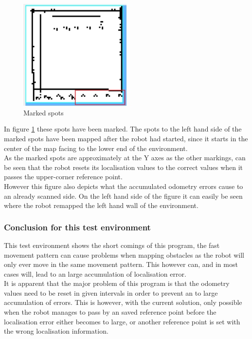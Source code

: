 \begin{figure}[h]
\centering
\includegraphics[width = 0.5\textwidth]{../../figures/map_results/dotted_odometry_error.png} 
\caption{Marked spots}
\label{dotted_odomery_error}
\end{figure}

In figure \ref{dotted_odomery_error} these spots have been marked. The spots to the left hand side of the marked spots have been mapped after the robot had started, since it starts in the center of the map facing to the lower end of the environment. \\
As the marked spots are approximately at the Y axes as the other markings, can be seen that the robot resets its localisation values to the correct values when it passes the upper-corner reference point. \\
However this figure also depicts what the accumulated odometry errors cause to an already scanned side. On the left hand side of the figure it can easily be seen where the robot remapped the left hand wall of the environment.\\

\subsubsection{Conclusion for this test environment}
This test environment shows the short comings of this program, the fast movement pattern can cause problems when mapping obstacles as the robot will only ever move in the same movement pattern. This however can, and in most cases will, lead to an large accumulation of localisation error.\\
It is apparent that the major problem of this program is that the odometry values need to be reset in given intervals in order to prevent an to large accumulation of errors. This is however, with the current solution, only possible when the robot manages to pass by an saved reference point before the localisation error either becomes to large, or another reference point is set with the wrong localisation information.\\[3ex]

